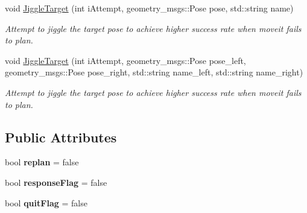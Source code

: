\begin{DoxyCompactItemize}
void \hyperlink{classM3MoveGroup_adf12117d8738588cadfa6ab62e008fea}{Jiggle\+Target} (int i\+Attempt, geometry\+\_\+msgs\+::\+Pose pose, std\+::string name)
\begin{DoxyCompactList}\small\item\em Attempt to jiggle the target pose to achieve higher success rate when moveit fails to plan. \end{DoxyCompactList}\item 
void \hyperlink{classM3MoveGroup_a01c4d2e768a050ad0652ecc2b612946c}{Jiggle\+Target} (int i\+Attempt, geometry\+\_\+msgs\+::\+Pose pose\+\_\+left, geometry\+\_\+msgs\+::\+Pose pose\+\_\+right, std\+::string name\+\_\+left, std\+::string name\+\_\+right)
\begin{DoxyCompactList}\small\item\em Attempt to jiggle the target pose to achieve higher success rate when moveit fails to plan. \end{DoxyCompactList}\end{DoxyCompactItemize}
\subsection*{Public Attributes}
\begin{DoxyCompactItemize}
\item 
\mbox{\label{classM3MoveGroup_a11d211d48cb3a6538546436770a4a636}} 
bool {\bfseries replan} = false
\item 
\mbox{\label{classM3MoveGroup_a726d32f722db2d932e88c5edcbfc6b93}} 
bool {\bfseries response\+Flag} = false
\item 
\mbox{\label{classM3MoveGroup_a26e3a6a95c9e3b3bc587dfdec2d44dc4}} 
bool {\bfseries quit\+Flag} = false
\end{DoxyCompactItemize}
